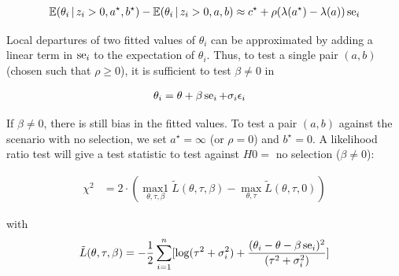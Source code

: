 \documentclass[11pt,a4paper,twoside]{book}\usepackage[]{graphicx}\usepackage[]{color}
\begin{document}
\begin{align}
\mathbb{E}(\theta_i\,\vert\, z_i > 0, a^\star, b^\star) - \mathbb{E}(\theta_i\,\vert\, z_i > 0, a, b) \approx c^\star + \rho(\lambda(a^\star) - \lambda(a))\operatorname{se}_i \nonumber
\end{align}

Local departures of two fitted values of $\theta_i$ can be approximated by adding a linear term in $\operatorname{se}_i$ to the expectation of $\theta_i$. Thus, to test a single pair $(a,b)$ (chosen such that $\rho \geq 0$), it is sufficient to test $\beta \neq 0$ in

\begin{align}
\theta_i &= \theta + \beta \operatorname{se}_i + \sigma_i \epsilon_i \nonumber
\end{align}

If $\beta \neq 0$, there is still bias in the fitted values. To test a pair $(a,b)$ against the scenario with no selection, we set $a^\star = \infty$ (or $\rho = 0$) and $b^\star = 0$. A likelihood ratio test will give a test statistic to test against $H0 =$ no selection ($\beta \neq 0$):

\begin{align}
\chi^2 &= 2\cdot(\operatorname*{max1}_{\theta, \tau, \beta}\tilde{L}(\theta, \tau, \beta) - \operatorname*{max}_{\theta, \tau}\tilde{L}(\theta, \tau, 0)) \label{eq:copas.small.study}
\end{align}

with 
\begin{align}
\tilde{L}(\theta, \tau, \beta) = -\frac{1}{2}\sum_{i = 1}^n[\log(\tau^2 + \sigma_i^2) + \frac{(\theta_i - \theta - \beta \operatorname{se}_i)^2}{(\tau^2 + \sigma_i^2)}] \nonumber
\end{align}
\end{document}
